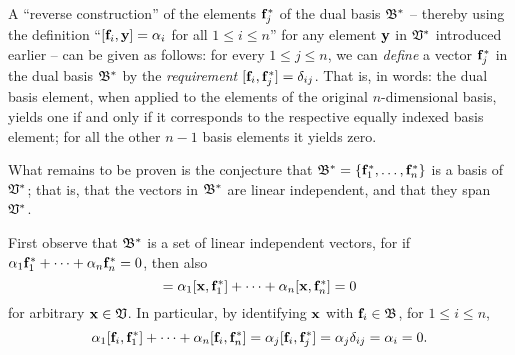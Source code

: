 {\color{OliveGreen}
\bproof


A ``reverse construction'' of the elements ${\bf f}_j^*$ of the dual basis ${\frak B}^*$
-- thereby using the definition ``$[{\bf f}_i,{\bf y}] = \alpha_i$
for all $1 \le i \le n$''
for any element ${\bf y}$ in ${\frak V}^*$ introduced earlier
--
can be given as follows:
for every $1\le j \le n$,
we can {\em define} a vector ${\bf f}_j^*$ in the dual basis ${\frak B}^*$
by the {\em requirement}   $[{\bf f}_i,{\bf f}_j^*] = \delta_{ij}$.
That is, in words:
the dual basis element, when applied to the elements of the original $n$-dimensional basis,
yields one if and only if  it corresponds to the respective equally indexed basis element;
for all the other $n-1$ basis elements it yields zero.

What remains to be proven is the conjecture that
${\frak B}^* = \{{\bf f}_1^*,\ldots , {\bf f}_n^*\}$
is a basis of ${\frak V}^*$; that is, that the vectors in ${\frak B}^*$ are linear independent,
and that they span ${\frak V}^*$.

First observe that ${\frak B}^*$ is a set of linear independent vectors,
for if
$ \alpha_1 {\bf f}_1^* + \cdots + \alpha_n {\bf f}_n^*=0$, then also
\begin{equation}
 [{\bf x},\alpha_1 {\bf f}_1^* + \cdots + \alpha_n {\bf f}_n^*]=
 \alpha_1 [{\bf x},{\bf f}_1^*] + \cdots + \alpha_n [{\bf x},{\bf f}_n^*]=
0
\end{equation}
for arbitrary ${\bf x}\in {\frak V}$.
In particular, by identifying ${\bf x}$ with ${\bf f}_i \in {\frak B}$, for $1 \le i \le n$,
\begin{equation}
 \alpha_1 [{\bf f}_i,{\bf f}_1^*] + \cdots + \alpha_n [{\bf f}_i,{\bf f}_n^*]= \alpha_j [{\bf f}_i,{\bf f}_j^*] = \alpha_j \delta_{ij} = \alpha_i=
0.
\end{equation}

}
